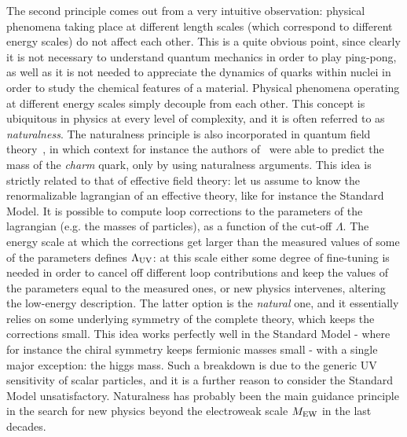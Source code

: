 \documentclass[12pt,a4paper]{book}
\begin{document}
The second principle comes out from a very intuitive observation: physical phenomena taking place at different length scales (which correspond to different energy scales) do not affect each other. This is a quite obvious point, since clearly it is not necessary to understand quantum mechanics in order to play ping-pong, as well as it is not needed to appreciate the dynamics of quarks within nuclei in order to study the chemical features of a material. Physical phenomena operating at different energy scales simply decouple from each other. This concept is ubiquitous in physics at every level of complexity, and it is often referred to as \textit{naturalness}. The naturalness principle is also incorporated in quantum field theory~\cite{Susskind:1978ms, Veltman:1980mj, Dimopoulos:1979qi}, in which context for instance the authors of~\cite{Gaillard:1974hs} were able to predict the mass of the \textit{charm} quark, only by using naturalness arguments. This idea is strictly related to that of effective field theory: let us assume to know the renormalizable lagrangian of an effective theory, like for instance the Standard Model. It is possible to compute loop corrections to the parameters of the lagrangian (e.g. the masses of particles), as a function of the cut-off $\Lambda$. The energy scale at which the corrections get larger than the measured values of some of the parameters defines $\Lambda_{\rm UV}$: at this scale either some degree of fine-tuning is needed in order to cancel off different loop contributions and keep the values of the parameters equal to the measured ones, or new physics intervenes, altering the low-energy description. The latter option is the \textit{natural} one, and it essentially relies on some underlying symmetry of the complete theory, which keeps the corrections small. This idea works perfectly well in the Standard Model - where for instance the chiral symmetry keeps fermionic masses small - with a single major exception: the higgs mass. Such a breakdown is due to the generic UV sensitivity of scalar particles, and it is a further reason to consider the Standard Model unsatisfactory. Naturalness has probably been the main guidance principle in the search for new physics beyond the electroweak scale $M_{\rm EW}$ in the last decades.\\
\end{document}
